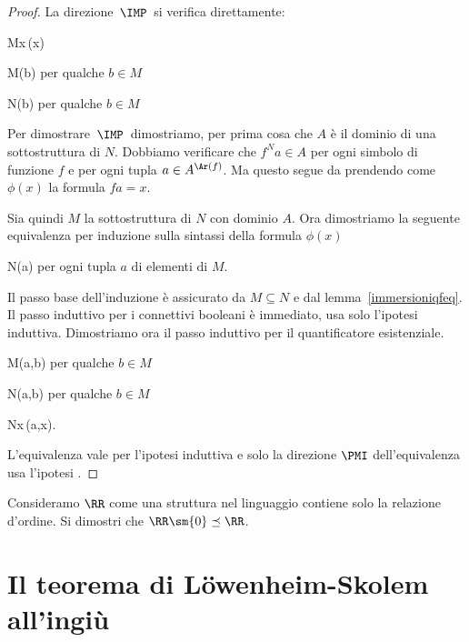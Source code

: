 \begin{proof}
La direzione $\,\IMP\,$ si verifica direttamente:

%
{\IMP}%
{M\models\E x\,\phi(x)}

\ceq{}%
{\IMP}%
{M\models\phi(b)} per qualche $b\in M$

\ceq{}%
{\IMP}%
{N\models\phi(b)} per qualche $b\in M$

Per dimostrare $\,\IMP\,$ dimostriamo, per prima cosa che $A$ \`e il dominio di una sottostruttura di $N$. Dobbiamo verificare che $f^Na\in A$ per ogni simbolo di funzione $f$ e per ogni tupla $a \in A^{\Ar(f)}$. Ma questo segue da  prendendo come $\phi(x)$ la formula $fa=x$. 

Sia quindi $M$ la sottostruttura di $N$ con dominio $A$. Ora dimostriamo la seguente equivalenza per induzione sulla sintassi della formula $\phi(x)$ 

%
{\IFF}%
{N\models\phi(a)} per ogni tupla $a$ di elementi di $M$.

Il passo base dell'induzione \`e assicurato da $M\subseteq N$ e dal lemma~\ref{immersioniqfeq}. Il passo induttivo per i connettivi booleani \`e immediato, usa solo l'ipotesi induttiva. Dimostriamo ora il passo induttivo per il quantificatore esistenziale.

%
{\IFF}%
{M\models\phi(a,b)} per qualche $b\in M$

%
{\IFF}%
{N\models\phi(a,b)} per qualche $b\in M$

%
{\IFF}%
{N\models\E x\,\phi(a,x).}

L'equivalenza  vale per l'ipotesi induttiva e solo la direzione $\PMI$ dell'equivalenza  usa l'ipotesi .
\end{proof}

\begin{exercise} 
Consideramo $\RR$ come una struttura nel linguaggio contiene solo la relazione d'ordine. Si dimostri che $\RR\sm\{0\}\preceq \RR$.
\end{exercise}




\section{Il teorema di L\"owenheim-Skolem all'ingi\`u}
\label{LoewenheimSkolem}

